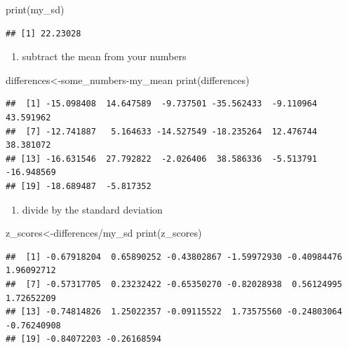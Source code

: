 \documentclass[
]{book}
\newenvironment{Shaded}{\begin{snugshade}}{\end{snugshade}}
\newcommand{\FunctionTok}[1]{\textcolor[rgb]{0.00,0.00,0.00}{#1}}
\newcommand{\NormalTok}[1]{#1}
\newcommand{\OtherTok}[1]{\textcolor[rgb]{0.56,0.35,0.01}{#1}}
\newcommand{\SpecialCharTok}[1]{\textcolor[rgb]{0.00,0.00,0.00}{#1}}
\providecommand{\tightlist}{%
  \setlength{\itemsep}{0pt}\setlength{\parskip}{0pt}}
\begin{document}
\begin{Shaded}
\begin{Highlighting}[]
\FunctionTok{print}\NormalTok{(my\_sd)}
\end{Highlighting}
\end{Shaded}

\begin{verbatim}
## [1] 22.23028
\end{verbatim}

\begin{enumerate}
\def\labelenumi{\arabic{enumi}.}
\setcounter{enumi}{2}
\tightlist
\item
  subtract the mean from your numbers
\end{enumerate}

\begin{Shaded}
\begin{Highlighting}[]
\NormalTok{differences}\OtherTok{\textless{}{-}}\NormalTok{some\_numbers}\SpecialCharTok{{-}}\NormalTok{my\_mean}
\FunctionTok{print}\NormalTok{(differences)}
\end{Highlighting}
\end{Shaded}

\begin{verbatim}
##  [1] -15.098408  14.647589  -9.737501 -35.562433  -9.110964  43.591962
##  [7] -12.741887   5.164633 -14.527549 -18.235264  12.476744  38.381072
## [13] -16.631546  27.792822  -2.026406  38.586336  -5.513791 -16.948569
## [19] -18.689487  -5.817352
\end{verbatim}

\begin{enumerate}
\def\labelenumi{\arabic{enumi}.}
\setcounter{enumi}{3}
\tightlist
\item
  divide by the standard deviation
\end{enumerate}

\begin{Shaded}
\begin{Highlighting}[]
\NormalTok{z\_scores}\OtherTok{\textless{}{-}}\NormalTok{differences}\SpecialCharTok{/}\NormalTok{my\_sd}
\FunctionTok{print}\NormalTok{(z\_scores)}
\end{Highlighting}
\end{Shaded}

\begin{verbatim}
##  [1] -0.67918204  0.65890252 -0.43802867 -1.59972930 -0.40984476  1.96092712
##  [7] -0.57317705  0.23232422 -0.65350270 -0.82028938  0.56124995  1.72652209
## [13] -0.74814826  1.25022357 -0.09115522  1.73575560 -0.24803064 -0.76240908
## [19] -0.84072203 -0.26168594
\end{verbatim}
\end{document}
